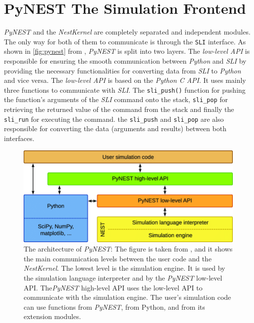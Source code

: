 \section{PyNEST The Simulation Frontend}

\emph{PyNEST} and the \emph{NestKernel} are completely separated and independent modules. The only way for both of them to communicate is through the \texttt{SLI} interface. As shown in \autoref{fig:pynest} from \citep{epp}, \emph{PyNEST} is split into two layers. The \emph{low-level API} is responsible for ensuring the smooth communication between \emph{Python} and \emph{SLI} by providing the necessary functionalities for converting data from \emph{SLI} to \emph{Python} and vice versa. The \emph{low-level API} is based on the \emph{Python C API}. It uses mainly three functions to communicate with \emph{SLI}. The \texttt{sli\_push()} function for pushing the function's arguments of the \emph{SLI} command onto the stack, \texttt{sli\_pop} for retrieving the returned value of the command from the stack and finally the \texttt{sli\_run} for executing the command.  the \texttt{sli\_push} and \texttt{sli\_pop} are also responsible for converting the data (arguments and results) between both interfaces.


\begin{figure}[ht!]
\centering
\includegraphics[width=1\textwidth,height=1\textheight,keepaspectratio]{src/pic/The-architecture-of-PyNEST-The-lowest-level-is-the-simulation-engine-It-is-used-by.png}
\caption{The architecture of \emph{PyNEST}: The figure is taken from \citep{epp}, and it shows the main communication levels between the user code and the \emph{NestKernel}. The lowest level is the simulation engine. It is used by
the simulation language interpreter and by the \emph{PyNEST} low-level API. The\emph{PyNEST} high-level
API uses the low-level API to communicate with the simulation engine. The user’s simulation
code can use functions from \emph{PyNEST}, from Python, and from its extension modules.}
\label{fig:pynest}
\end{figure}


